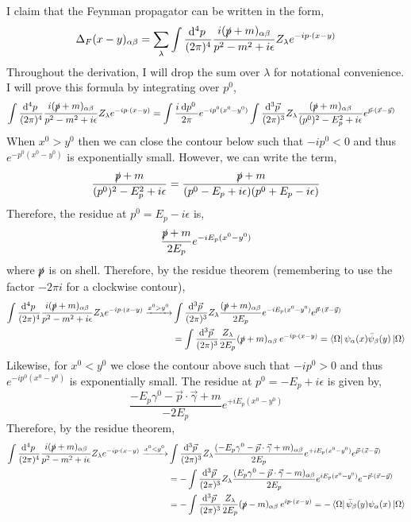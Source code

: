 \documentclass[12pt]{article}
\begin{document}
I claim that the Feynman propagator can be written in the form,
\[ \Delta_F(x - y)_{\alpha \beta} = \sum_{\lambda} \int \frac{\mathrm{d}^{4} p \:}{(2 \pi)^4} \frac{ i (\slashed{p} + m)_{\alpha \beta}}{p^2 - m^2 + i \epsilon} Z_{\lambda} e^{-i p \cdot (x - y)} \]
Throughout the derivation, I will drop the sum over $\lambda$ for notational convenience.
I will prove this formula by integrating over $p^0$,
\begin{align*}
\int \frac{\mathrm{d}^{4} p \:}{(2 \pi)^4} \frac{ i (\slashed{p} + m)_{\alpha \beta}}{p^2 - m^2 + i \epsilon} Z_{\lambda} e^{-i p \cdot (x - y)} & =  \int \frac{i \: \mathrm{d}p^0 \:}{2 \pi} e^{-i p^0 (x^0 - y^0)} \int \frac{\mathrm{d}^{3} \vec{p} \:}{(2\pi)^3} Z_{\lambda} \frac{(\slashed{p} + m)_{\alpha \beta}}{(p^0)^2 - E_p^2 + i \epsilon} e^{\vec{p} \cdot (\vec{x} - \vec{y})}
\end{align*}
When $x^0 > y^0$ then we can close the contour below such that $-ip^0 < 0$ and thus $e^{- p^0 (x^0 - y^0)}$ is exponentially small. However, we can write the term,
\[ \frac{\slashed{p} + m}{(p^0)^2 - E_p^2 + i \epsilon} = \frac{\slashed{p} + m}{(p^0 - E_p + i \epsilon)(p^0 + E_p - i \epsilon)}  \]
Therefore, the residue at $p^0 = E_p - i \epsilon$ is,
\[ \frac{\slashed{p} + m}{2 E_p} e^{-i E_p (x^0 - y^0)} \]
where $\slashed{p}$ is on shell. Therefore, by the residue theorem (remembering to use the factor $- 2 \pi i$ for a clockwise contour), 
\begin{align*}
\int \frac{\mathrm{d}^{4} p \:}{(2 \pi)^4} \frac{ i (\slashed{p} + m)_{\alpha \beta}}{p^2 - m^2 + i \epsilon} Z_{\lambda} e^{-i p \cdot (x - y)}  \xrightarrow{x^0 > y^0} & \int \frac{\mathrm{d}^{3} \vec{p} \:}{(2\pi)^3} Z_{\lambda} \frac{(\slashed{p} + m)_{\alpha \beta}}{2 E_p} e^{-i E_p (x^0 - y^0)}  e^{\vec{p} \cdot (\vec{x} - \vec{y})}
\\
& =
\int \frac{\mathrm{d}^{3} \vec{p} \:}{(2\pi)^3} \frac{Z_{\lambda}}{2 E_p} (\slashed{p} + m)_{\alpha \beta} \: e^{- i p \cdot (x - y)} = \left< \Omega \right| \psi_{\alpha}(x) \bar{\psi}_{\beta}(y) \left| \Omega \right>
\end{align*}
Likewise, for $x^0 < y^0$ we close the contour above such that $-ip^0 > 0$ and thus $e^{-i p^0 (x^0 - y^0)}$ is exponentially small. The residue at $p^0 = - E_p + i \epsilon$ is given by,
\[ \frac{- E_p \gamma^0 - \vec{p} \cdot \vec{\gamma} + m}{-2 E_p} e^{+i E_p (x^0 - y^0)} \]
Therefore, by the residue theorem,
\begin{align*}
\int \frac{\mathrm{d}^{4} p \:}{(2 \pi)^4} \frac{ i (\slashed{p} + m)_{\alpha \beta}}{p^2 - m^2 + i \epsilon} Z_{\lambda} e^{-i p \cdot (x - y)}  \xrightarrow{x^0 < y^0} & \int \frac{\mathrm{d}^{3} \vec{p} \:}{(2\pi)^3} Z_{\lambda} \frac{(- E_p \gamma^0 - \vec{p} \cdot \vec{\gamma} + m)_{\alpha \beta}}{2 E_p} e^{+i E_p (x^0 - y^0)}  e^{\vec{p} \cdot (\vec{x} - \vec{y})}
\\
& = - \int \frac{\mathrm{d}^{3} \vec{p} \:}{(2\pi)^3} Z_{\lambda} \frac{(E_p \gamma^0 - \vec{p} \cdot \vec{\gamma} - m)_{\alpha \beta}}{2 E_p} e^{i E_p (x^0 - y^0)}  e^{- \vec{p} \cdot (\vec{x} - \vec{y})} 
\\
& =
- \int \frac{\mathrm{d}^{3} \vec{p} \:}{(2\pi)^3} \frac{Z_{\lambda}}{2 E_p} (\slashed{p} - m)_{\alpha \beta} \: e^{i p \cdot (x - y)} = - \left< \Omega \right| \bar{\psi}_{\beta}(y) \psi_{\alpha}(x) \left| \Omega \right>
\end{align*}
\end{document}
